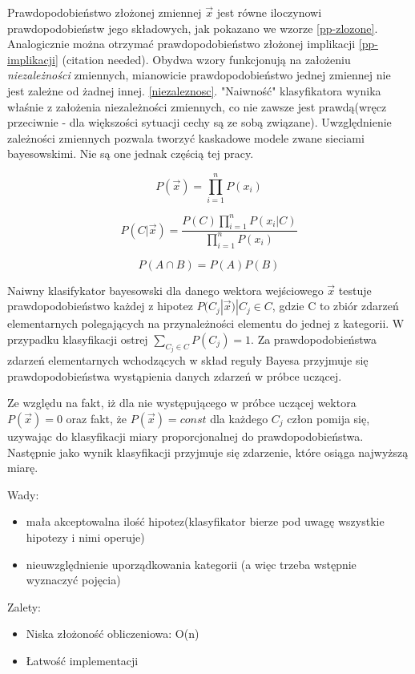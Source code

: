\documentclass[12pt,a4paper,oneside]{report} %
\begin{document}
Prawdopodobieństwo złożonej zmiennej $\vec{x}$ jest równe iloczynowi prawdopodobieństw jego składowych, jak pokazano we wzorze \ref{pp-zlozone}. Analogicznie można otrzymać prawdopodobieństwo złożonej implikacji \ref{pp-implikacji} (citation needed). Obydwa wzory funkcjonują na założeniu \emph{niezależności} zmiennych, mianowicie prawdopodobieństwo jednej zmiennej nie jest zależne od żadnej innej. \ref{niezaleznosc}. "Naiwność" klasyfikatora wynika właśnie z założenia niezależności zmiennych, co nie zawsze jest prawdą(wręcz przeciwnie - dla większości sytuacji cechy są ze sobą związane). Uwzględnienie zależności zmiennych pozwala tworzyć kaskadowe modele zwane sieciami bayesowskimi. \cite{dm-cichosz} Nie są one jednak częścią tej pracy.\par

\begin{equation}
P(\vec{x}) = \prod\limits_{i=1}^n{P(x_i)}
\end{equation}
\label{pp-zlozone}

\begin{equation}
P(C|\vec{x}) = \frac{P(C)\prod\limits_{i=1}^n{P(x_i|C)}}{\prod\limits_{i=1}^n{P({x_i})}}
\end{equation}
\label{pp-implikacji}

\begin{equation}
P(A \cap B) = P(A)P(B)
\end{equation}
\label{niezaleznosc}

Naiwny klasifykator bayesowski dla danego wektora wejściowego $\vec{x}$ testuje prawdopodobieństwo każdej z hipotez $P(C_j|\vec{x}) | C_j \in C$, gdzie C to zbiór zdarzeń elementarnych polegających na przynależności elementu do jednej z kategorii. W przypadku klasyfikacji ostrej $\sum\limits_{C_j \in C} P(C_j) = 1 $. Za prawdopodobieństwa zdarzeń elementarnych wchodzących w skład reguły Bayesa przyjmuje się prawdopodobieństwa wystąpienia danych zdarzeń w próbce uczącej. \par

Ze względu na fakt, iż dla nie występującego w próbce uczącej wektora $P(\vec{x}) = 0$ oraz fakt, że $P(\vec{x})=const$ dla każdego $C_j$ człon pomija się, uzywając do klasyfikacji miary proporcjonalnej do prawdopodobieństwa. Następnie jako wynik klasyfikacji przyjmuje się zdarzenie, które osiąga najwyższą miarę.\par

Wady:\par
\begin{itemize}
\item mała akceptowalna ilość hipotez(klasyfikator bierze pod uwagę wszystkie hipotezy i nimi operuje)
\item nieuwzględnienie uporządkowania kategorii (a więc trzeba wstępnie wyznaczyć pojęcia)
\end{itemize}
Zalety:\par
\begin{itemize}
\item Niska złożoność obliczeniowa: O(n)
\item Łatwość implementacji
\end{itemize}
\end{document}
